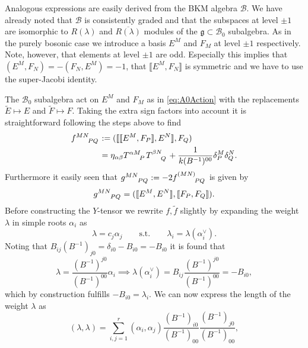 Analogous expressions are easily derived from the BKM algebra $\mathscr{B}$. We have already noted that $\mathscr{B}$ is consistently graded and that the subspaces at level $\pm 1$ are isomorphic to $R(\lambda)$ and $\overbar{R(\lambda)}$ modules of the $\mathfrak{g}\subset\mathscr{B}_0$ subalgebra. As in the purely bosonic case we introduce a basis $E^M$ and $F_M$ at level $\pm 1$ respectively. Note, however, that elements at level $\pm 1$ are odd. Especially this implies that $(E^M,F_N)=-(F_N,E^M)=-1$, that $\llbracket E^M,F_N\rrbracket$ is symmetric and we have to use the super-Jacobi identity. 

The $\mathscr{B}_0$ subalgebra act on $E^M$ and $F_M$ as in \eqref{eq:A0Action} with the replacements $\tilde{E}\mapsto E$ and $\tilde{F}\mapsto F$. Taking the extra sign factors into account it is straightforward following the steps above to find 
\begin{equation}
    \begin{aligned}
        \tensor{f}{^{MN}_{PQ}} &:= (\llbracket\llbracket E^M,F_P\rrbracket,E^N\rrbracket,F_Q)\\
                                &= \eta_{\alpha\beta}\tensor{T}{^{\alpha M}_P}\tensor{T}{^{\beta N}_Q}+\frac{1}{k(B^{-1})^{00}}\delta^M_P\delta^N_Q.
    \end{aligned}
\end{equation}
Furthermore it easily seen that $\tensor{g}{^{MN}_{PQ}}:=-2\tensor{f}{^{(MN)}_{PQ}}$ is given by
\begin{equation}
    \tensor{g}{^{MN}_{PQ}} = (\llbracket E^M,E^N\rrbracket,\llbracket F_P,F_Q\rrbracket). 
\end{equation}
Before constructing the $Y$-tensor we rewrite $f,\tilde{f}$ slightly by expanding the weight $\lambda$ in simple roots $\alpha_i$ as 
\begin{equation}
    \lambda = c_j\alpha_j\qquad \text{s.t.}\qquad \lambda_i = \lambda(\alpha_i^\vee).
\end{equation}
Noting that $B_{ij}(B^{-1})_{j0}=\delta_{i0}-B_{i0}=-B_{i0}$ it is found that 
\begin{equation}
    \lambda = \frac{(B^{-1})^{j0}}{(B^{-1})^{00}}\alpha_i \implies \lambda(\alpha_i^\vee) = B_{ij}\frac{(B^{-1})^{j0}}{(B^{-1})^{00}} = -B_{i0},
\end{equation}
which by construction fulfills $-B_{i0}=\lambda_i$. We can now express the length of the weight $\lambda$ as 
\begin{equation}
    (\lambda,\lambda) = \sum_{i,j=1}^r (\alpha_i,\alpha_j)\frac{(B^{-1})_{i0}}{(B^{-1})_{00}}\frac{(B^{-1})_{j0}}{(B^{-1})_{00}},
\end{equation}
